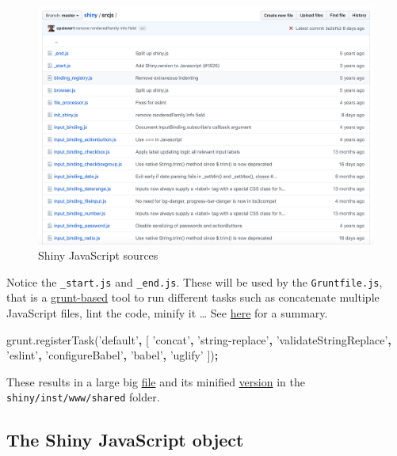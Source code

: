\documentclass[]{book}
\newenvironment{Shaded}{\begin{snugshade}}{\end{snugshade}}
\newcommand{\AttributeTok}[1]{\textcolor[rgb]{0.77,0.63,0.00}{#1}}
\newcommand{\NormalTok}[1]{#1}
\newcommand{\OperatorTok}[1]{\textcolor[rgb]{0.81,0.36,0.00}{\textbf{#1}}}
\newcommand{\StringTok}[1]{\textcolor[rgb]{0.31,0.60,0.02}{#1}}
\newcommand{\VariableTok}[1]{\textcolor[rgb]{0.00,0.00,0.00}{#1}}
\begin{document}
\begin{figure}
\includegraphics[width=32.08in]{images/survival-kit/shiny-js-sources} \caption{Shiny JavaScript sources}\label{fig:shiny-js-sources}
\end{figure}

Notice the \texttt{\_start.js} and \texttt{\_end.js}. These will be used by the \texttt{Gruntfile.js}, that is a \href{https://gruntjs.com}{grunt-based} tool to run different tasks such as concatenate multiple JavaScript files, lint the code, minify it \ldots{} See \href{https://github.com/rstudio/shiny/tree/master/tools}{here} for a summary.

\begin{Shaded}
\begin{Highlighting}[]
\VariableTok{grunt}\NormalTok{.}\AttributeTok{registerTask}\NormalTok{(}\StringTok{'default'}\OperatorTok{,}\NormalTok{ [}
\StringTok{'concat'}\OperatorTok{,}
\StringTok{'string-replace'}\OperatorTok{,}
\StringTok{'validateStringReplace'}\OperatorTok{,}
\StringTok{'eslint'}\OperatorTok{,}
\StringTok{'configureBabel'}\OperatorTok{,}
\StringTok{'babel'}\OperatorTok{,}
\StringTok{'uglify'}
\NormalTok{])}\OperatorTok{;}
\end{Highlighting}
\end{Shaded}

These results in a large big \href{https://github.com/rstudio/shiny/blob/master/inst/www/shared/shiny.js}{file} and its minified \href{https://github.com/rstudio/shiny/blob/master/inst/www/shared/shiny.min.js}{version} in the \texttt{shiny/inst/www/shared} folder.

\hypertarget{the-shiny-javascript-object}{%
\subsection{The Shiny JavaScript object}\label{the-shiny-javascript-object}}
\end{document}
